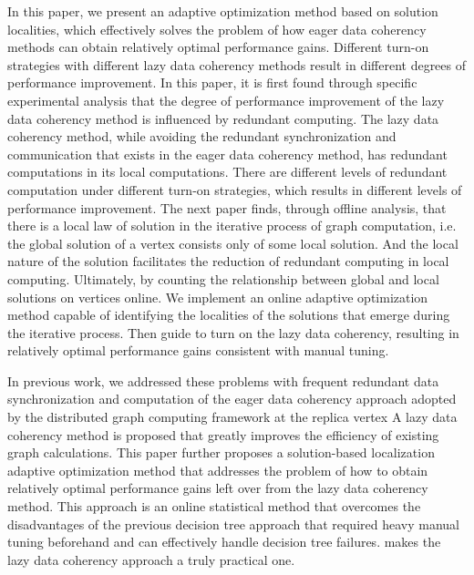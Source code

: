 In this paper, we present an adaptive optimization method based on solution localities, which effectively solves the problem of how eager data coherency methods can obtain relatively optimal performance gains.
Different turn-on strategies with different lazy data coherency methods result in different degrees of performance improvement.
In this paper, it is first found through specific experimental analysis that the degree of performance improvement of the lazy data coherency method is influenced by redundant computing.
The lazy data coherency method, while avoiding the redundant synchronization and communication that exists in the eager data coherency method, has redundant computations in its local computations.
There are different levels of redundant computation under different turn-on strategies, which results in different levels of performance improvement.
The next paper finds, through offline analysis, that there is a local law of solution in the iterative process of graph computation, i.e. the global solution of a vertex consists only of some local solution.
And the local nature of the solution facilitates the reduction of redundant computing in local computing.
Ultimately, by counting the relationship between global and local solutions on vertices online.
We implement an online adaptive optimization method capable of identifying the localities of the solutions that emerge during the iterative process.
Then guide to turn on the lazy data coherency, resulting in relatively optimal performance gains consistent with manual tuning.


In previous work, we addressed these problems with frequent redundant data synchronization and computation of the eager data coherency approach adopted by the distributed graph computing framework at the replica vertex
A lazy data coherency method is proposed that greatly improves the efficiency of existing graph calculations.
This paper further proposes a solution-based localization adaptive optimization method that addresses the problem of how to obtain relatively optimal performance gains left over from the lazy data coherency method.
This approach is an online statistical method that overcomes the disadvantages of the previous decision tree approach that required heavy manual tuning beforehand and can effectively handle decision tree failures.
makes the lazy data coherency approach a truly practical one.

